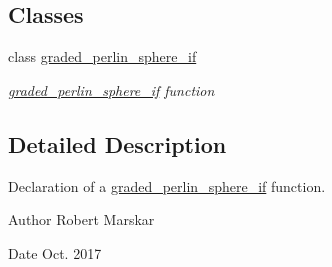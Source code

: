 \subsection*{Classes}
\begin{DoxyCompactItemize}
\item 
class \hyperlink{classgraded__perlin__sphere__if}{graded\+\_\+perlin\+\_\+sphere\+\_\+if}
\begin{DoxyCompactList}\small\item\em \hyperlink{classgraded__perlin__sphere__if}{graded\+\_\+perlin\+\_\+sphere\+\_\+if} function \end{DoxyCompactList}\end{DoxyCompactItemize}


\subsection{Detailed Description}
Declaration of a \hyperlink{classgraded__perlin__sphere__if}{graded\+\_\+perlin\+\_\+sphere\+\_\+if} function. 

\begin{DoxyAuthor}{Author}
Robert Marskar 
\end{DoxyAuthor}
\begin{DoxyDate}{Date}
Oct. 2017 
\end{DoxyDate}
